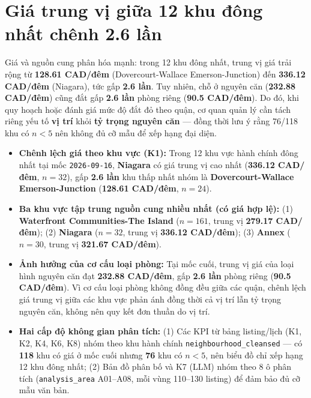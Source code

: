 \documentclass[11pt,a4paper]{article}
\begin{document}
\section{Giá trung vị giữa 12 khu đông nhất chênh 2.6 lần}

\begin{storybox}
Giá và nguồn cung phân hóa mạnh: trong 12 khu đông nhất, trung vị giá trải rộng từ \textbf{128.61 CAD/đêm} (Dovercourt-Wallace Emerson-Junction) đến \textbf{336.12 CAD/đêm} (Niagara), tức gấp \textbf{2.6 lần}. Tuy nhiên, chỗ ở nguyên căn (\textbf{232.88 CAD/đêm}) cũng đắt gấp \textbf{2.6 lần} phòng riêng (\textbf{90.5 CAD/đêm}). Do đó, khi quy hoạch hoặc đánh giá mức độ đắt đỏ theo quận, cơ quan quản lý cần tách riêng yếu tố \textbf{vị trí} khỏi \textbf{tỷ trọng nguyên căn} --- đồng thời lưu ý rằng 76/118 khu có $n < 5$ nên không đủ cỡ mẫu để xếp hạng đại diện.
\end{storybox}

\begin{itemize}
  \item \textbf{Chênh lệch giá theo khu vực (K1):} Trong 12 khu vực hành chính đông nhất tại mốc \texttt{2026-09-16}, \textbf{Niagara} có giá trung vị cao nhất (\textbf{336.12 CAD/đêm}, $n = 32$), gấp \textbf{2.6 lần} khu thấp nhất nhóm là \textbf{Dovercourt-Wallace Emerson-Junction} (\textbf{128.61 CAD/đêm}, $n = 24$).
  \item \textbf{Ba khu vực tập trung nguồn cung nhiều nhất (có giá hợp lệ):}
    (1) \textbf{Waterfront Communities-The Island} ($n = 161$, trung vị \textbf{279.17 CAD/đêm});
    (2) \textbf{Niagara} ($n = 32$, trung vị \textbf{336.12 CAD/đêm});
    (3) \textbf{Annex} ($n = 30$, trung vị \textbf{321.67 CAD/đêm}).
  \item \textbf{Ảnh hưởng của cơ cấu loại phòng:} Tại mốc cuối, trung vị giá của loại hình nguyên căn đạt \textbf{232.88 CAD/đêm}, gấp \textbf{2.6 lần} phòng riêng (\textbf{90.5 CAD/đêm}). Vì cơ cấu loại phòng không đồng đều giữa các quận, chênh lệch giá trung vị giữa các khu vực phản ánh đồng thời cả vị trí lẫn tỷ trọng nguyên căn, không nên quy kết đơn thuần do vị trí.
  \item \textbf{Hai cấp độ không gian phân tích:}
    (1) Các KPI từ bảng listing/lịch (K1, K2, K4, K6, K8) nhóm theo khu hành chính \texttt{neighbourhood\_cleansed} --- có \textbf{118} khu có giá ở mốc cuối nhưng \textbf{76} khu có $n < 5$, nên biểu đồ chỉ xếp hạng 12 khu đông nhất;
    (2) Bản đồ phân bố và K7 (LLM) nhóm theo 8 ô phân tích (\texttt{analysis\_area} A01--A08, mỗi vùng 110--130 listing) để đảm bảo đủ cỡ mẫu văn bản.
\end{itemize}
\end{document}
